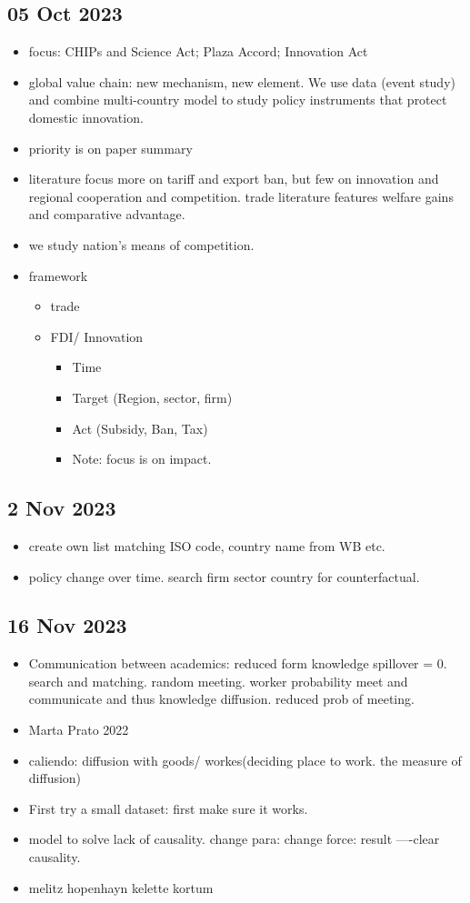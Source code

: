 	\subsection{05 Oct 2023}
		\begin{itemize}
		\item focus: CHIPs and Science Act; Plaza Accord; Innovation Act
		\item global value chain: new mechanism, new element. We use data (event study) and combine multi-country model to study policy instruments that protect domestic innovation.
		\item priority is on paper summary
		\item literature focus more on tariff and export ban, but few on innovation and regional cooperation and competition. trade literature features welfare gains and comparative advantage.
		\item we study nation's means of competition.
		\item framework
			\begin{itemize}
			\item trade
			\item FDI/ Innovation
				\begin{itemize}
				\item Time
				\item Target (Region, sector, firm)
				\item Act (Subsidy, Ban, Tax)
				\item Note: focus is on impact.
				\end{itemize}
			\end{itemize}
		\end{itemize}
	\subsection{2 Nov 2023}
		\begin{itemize}
		\item create own list matching ISO code, country name from WB etc.
		\item policy change over time. search firm sector country for counterfactual.
		\end{itemize}
	\subsection{16 Nov 2023}
		\begin{itemize}
			\item Communication between academics: reduced form knowledge spillover = 0. search and matching. random meeting. worker probability meet and communicate and thus knowledge diffusion. reduced prob of meeting.
			\item Marta Prato 2022
			\item caliendo: diffusion with goods/ workes(deciding place to work. the measure of diffusion)
			\item First try a small dataset: first make sure it works.
			\item model to solve lack of causality. change para: change force: result ----clear causality.
			\item melitz hopenhayn kelette kortum
		\end{itemize}
